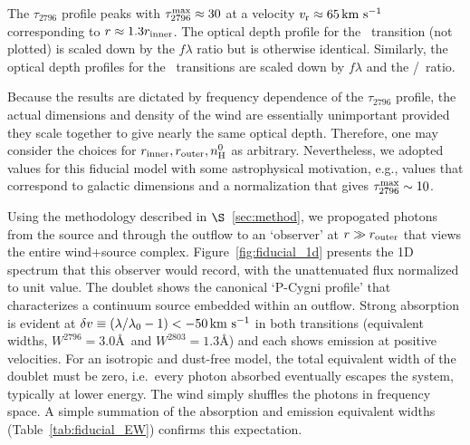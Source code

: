 \documentclass[12pt,preprint]{aastex}
\begin{document}
The $\tau_{2796}$ profile peaks with $\tau_{2796}^{\rm max} \approx 30$
at a velocity $v_{\rm r} \approx 65 \, {\rm km~s^{-1}}$ corresponding to $r \approx 1.3
r_{\rm inner}$.  The optical depth profile for the \mgiib\ transition
(not plotted) is scaled down by the $f\lambda$ ratio but is otherwise identical.  Similarly,
the optical depth profiles for the \feiid\ transitions are
scaled down by $f \lambda$ and the \nfe/\nmg\ ratio.  

Because the results are dictated by frequency dependence of the
$\tau_{2796}$ profile, 
the actual dimensions and density of the wind are
essentially unimportant provided they scale together to give nearly the same
optical depth. Therefore, one may consider the choices for
$r_{\rm inner}, r_{\rm outer}, n_{\rm H}^0$ as arbitrary.
Nevertheless, we adopted values for this fiducial model with
some astrophysical motivation,  e.g., values that correspond to
galactic dimensions and a normalization that gives $\tau_{2796}^{\rm
  max} \sim 10$.


Using the methodology described in $\S$~\ref{sec:method}, we
propogated photons from the source and through the outflow to an
`observer' at $r \gg r_{\rm outer}$ that views the entire wind+source
complex.  Figure~\ref{fig:fiducial_1d} presents the 1D spectrum
that this observer would record, with the unattenuated flux
normalized to unit value.   The  doublet
shows the canonical `P-Cygni profile' that characterizes a continuum
source embedded within an outflow.  Strong absorption is evident at
$\delta v  \equiv (\lambda/\lambda_0 - 1) < -50 \, {\rm km~s^{-1}}$ in both transitions (equivalent widths, $W^{2796} =
3.0$\AA\ and $W^{2803} = 1.3$\AA) and each shows emission at
positive velocities.  For an isotropic and dust-free model, the
total equivalent width of the doublet must be zero,
i.e.\ every photon
absorbed eventually escapes the system, typically at lower
energy.  The wind simply shuffles the photons in frequency space.
A simple summation of the absorption and emission equivalent widths
(Table~\ref{tab:fiducial_EW}) confirms this expectation.
\end{document}
